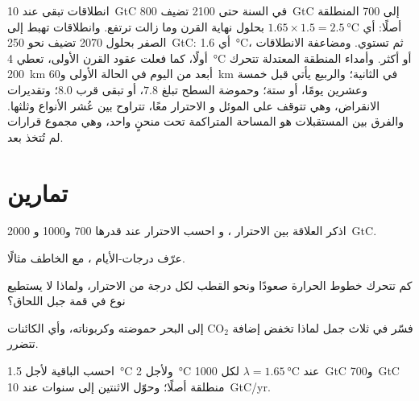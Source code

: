 \begin{example}\label{ex:b2:global-change:scenarios}
انطلاقات تبقى عند \qty{10}{GtC} في السنة حتى 2100 تضيف \qty{800}{GtC}
إلى \qty{700}{} المنطلقة أصلًا: أي $1.65\times 1.5 =
\qty{2.5}{\celsius}$ بحلول نهاية القرن وما زالت ترتفع. وانطلاقات
تهبط إلى الصفر بحلول 2070 تضيف نحو \qty{250}{GtC}: أي \qty{1.6}{\celsius}،
ثم تستوي. ومضاعفة الانطلاقات أولًا، كما فعلت عقود القرن
الأولى، تعطي \qty{4}{\celsius} أو أكثر. وأمداء
المنطقة المعتدلة تتحرك \qty{200}{km} أبعد من اليوم في الحالة الأولى
و\qty{60}{km} في الثانية؛ والربيع يأتي قبل خمسة وعشرين
يومًا، أو ستة؛ وحموضة السطح تبلغ $7.8$، أو تبقى قرب
$8.0$؛ وتقديرات الانقراض، وهي تتوقف على الموئل و
الاحترار معًا، تتراوح بين عُشر الأنواع وثلثها.
والفرق بين المستقبلات هو المساحة المتراكمة تحت منحنٍ
واحد، وهي مجموع قرارات لم تُتخذ بعد.
\end{example}

\section{تمارين}

\begin{exercise}[$\star$]\label{exo:b2:global-change:1}
اذكر العلاقة بين الاحترار ، و
احسب الاحترار عند  قدرها 700 و1000 و
\qty{2000}{GtC}.
\end{exercise}

\begin{exercise}[$\star$]\label{exo:b2:global-change:2}
عرّف درجات-الأيام ، مع الخاطف
مثالًا.
\end{exercise}

\begin{exercise}[$\star$]\label{exo:b2:global-change:3}
كم تتحرك خطوط الحرارة صعودًا ونحو القطب لكل درجة من
الاحترار، ولماذا لا يستطيع نوع في قمة جبل اللحاق؟
\end{exercise}

\begin{exercise}[$\star$]\label{exo:b2:global-change:4}
فسّر في ثلاث جمل لماذا تخفض إضافة \ensuremath{\mathrm{CO_2}} إلى البحر
حموضته وكربوناته، وأي الكائنات تتضرر.
\end{exercise}

\begin{exercise}[$\star\star$]\label{exo:b2:global-change:5}
احسب  الباقية لأجل \qty{1.5}{\celsius} ولأجل
\qty{2}{\celsius} عند $\lambda = \qty{1.65}{\celsius}$ لكل
\qty{1000}{GtC} و\qty{700}{GtC} منطلقة أصلًا؛ وحوّل الاثنتين إلى
سنوات عند \qty{10}{GtC/yr}.
\end{exercise}

